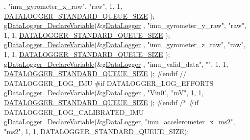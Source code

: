 \begin{DoxyCode}
{      , \textcolor{stringliteral}{"imu\_gyrometer\_x\_raw"}, \textcolor{stringliteral}{"raw"}, 1, 1, \hyperlink{datalogger_01_07Caio-PC's_01conflicted_01copy_012012-11-23_08_8h_ac244ccff7e47d7f9e79c1b606664f4fa}{DATALOGGER\_STANDARD\_QUEUE\_SIZE}
      );
        \hyperlink{gdatalogger_8c_a3f8f2b3c3f5edc72c3a1887965a544c1}{gDataLogger\_DeclareVariable}(&\hyperlink{datalogger_01_07Caio-PC's_01conflicted_01copy_012012-11-23_08_8c_abe3b9c2c4e21e79c7b046b5986d13acc}{gDataLogger}
      , \textcolor{stringliteral}{"imu\_gyrometer\_y\_raw"}, \textcolor{stringliteral}{"raw"}, 1, 1, \hyperlink{datalogger_01_07Caio-PC's_01conflicted_01copy_012012-11-23_08_8h_ac244ccff7e47d7f9e79c1b606664f4fa}{DATALOGGER\_STANDARD\_QUEUE\_SIZE}
      );
        \hyperlink{gdatalogger_8c_a3f8f2b3c3f5edc72c3a1887965a544c1}{gDataLogger\_DeclareVariable}(&\hyperlink{datalogger_01_07Caio-PC's_01conflicted_01copy_012012-11-23_08_8c_abe3b9c2c4e21e79c7b046b5986d13acc}{gDataLogger}
      , \textcolor{stringliteral}{"imu\_gyrometer\_z\_raw"}, \textcolor{stringliteral}{"raw"}, 1, 1, \hyperlink{datalogger_01_07Caio-PC's_01conflicted_01copy_012012-11-23_08_8h_ac244ccff7e47d7f9e79c1b606664f4fa}{DATALOGGER\_STANDARD\_QUEUE\_SIZE}
      );
    \hyperlink{gdatalogger_8c_a3f8f2b3c3f5edc72c3a1887965a544c1}{gDataLogger\_DeclareVariable}(&\hyperlink{datalogger_01_07Caio-PC's_01conflicted_01copy_012012-11-23_08_8c_abe3b9c2c4e21e79c7b046b5986d13acc}{gDataLogger}
      , \textcolor{stringliteral}{"imu\_valid\_data"}, \textcolor{stringliteral}{""}, 1, 1, \hyperlink{datalogger_01_07Caio-PC's_01conflicted_01copy_012012-11-23_08_8h_ac244ccff7e47d7f9e79c1b606664f4fa}{DATALOGGER\_STANDARD\_QUEUE\_SIZE}
      );
\textcolor{preprocessor}{        #endif // DATALOGGER\_LOG\_IMU}
\textcolor{preprocessor}{}        
\textcolor{preprocessor}{    #if DATALOGGER\_LOG\_EFFORTS}
\textcolor{preprocessor}{}    \hyperlink{gdatalogger_8c_a3f8f2b3c3f5edc72c3a1887965a544c1}{gDataLogger\_DeclareVariable}(&\hyperlink{datalogger_01_07Caio-PC's_01conflicted_01copy_012012-11-23_08_8c_abe3b9c2c4e21e79c7b046b5986d13acc}{gDataLogger}
      , \textcolor{stringliteral}{"Vin0"}, \textcolor{stringliteral}{"mV"}, 1, 1, \hyperlink{datalogger_01_07Caio-PC's_01conflicted_01copy_012012-11-23_08_8h_ac244ccff7e47d7f9e79c1b606664f4fa}{DATALOGGER\_STANDARD\_QUEUE\_SIZE}
      );
\textcolor{preprocessor}{    #endif}
\textcolor{preprocessor}{}\textcolor{comment}{/*}
\textcolor{comment}{    #if DATALOGGER\_LOG\_CALIBRATED\_IMU}
\textcolor{comment}{    gDataLogger\_DeclareVariable(&gDataLogger, "imu\_accelerometer\_x\_ms2", "ms2",
       1, 1, DATALOGGER\_STANDARD\_QUEUE\_SIZE);}
}
\end{DoxyCode}
